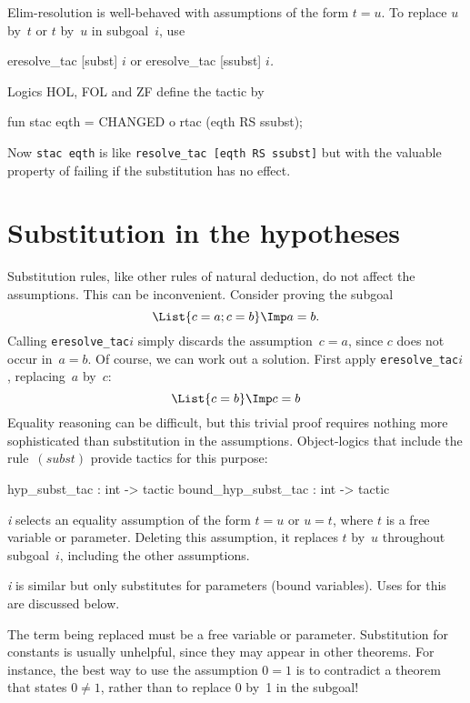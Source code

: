 Elim-resolution is well-behaved with assumptions of the form $t=u$.
To replace $u$ by~$t$ or $t$ by~$u$ in subgoal~$i$, use
\begin{ttbox} 
eresolve_tac [subst] \(i\)    {\rm or}    eresolve_tac [ssubst] \(i\){\it.}
\end{ttbox}

Logics HOL, FOL and ZF define the tactic  by
\begin{ttbox} 
fun stac eqth = CHANGED o rtac (eqth RS ssubst);
\end{ttbox}
Now {\tt stac~eqth} is like {\tt resolve_tac [eqth RS ssubst]} but with the
valuable property of failing if the substitution has no effect.


\section{Substitution in the hypotheses}
Substitution rules, like other rules of natural deduction, do not affect
the assumptions.  This can be inconvenient.  Consider proving the subgoal
\[ \List{c=a; c=b} \Imp a=b. \]
Calling {\tt eresolve_tac\ts[ssubst]\ts\(i\)} simply discards the
assumption~$c=a$, since $c$ does not occur in~$a=b$.  Of course, we can
work out a solution.  First apply {\tt eresolve_tac\ts[subst]\ts\(i\)},
replacing~$a$ by~$c$:
\[ \List{c=b} \Imp c=b \]
Equality reasoning can be difficult, but this trivial proof requires
nothing more sophisticated than substitution in the assumptions.
Object-logics that include the rule~$(subst)$ provide tactics for this
purpose:
\begin{ttbox} 
hyp_subst_tac       : int -> tactic
bound_hyp_subst_tac : int -> tactic
\end{ttbox}
\begin{ttdescription}
\item[\ttindexbold{hyp_subst_tac} {\it i}] 
  selects an equality assumption of the form $t=u$ or $u=t$, where $t$ is a
  free variable or parameter.  Deleting this assumption, it replaces $t$
  by~$u$ throughout subgoal~$i$, including the other assumptions.

\item[\ttindexbold{bound_hyp_subst_tac} {\it i}] 
  is similar but only substitutes for parameters (bound variables).
  Uses for this are discussed below.
\end{ttdescription}
The term being replaced must be a free variable or parameter.  Substitution
for constants is usually unhelpful, since they may appear in other
theorems.  For instance, the best way to use the assumption $0=1$ is to
contradict a theorem that states $0\not=1$, rather than to replace 0 by~1
in the subgoal!

